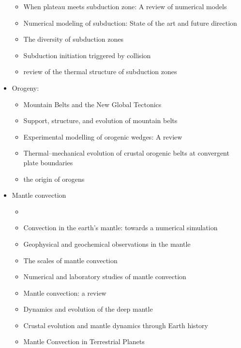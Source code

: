 \begin{itemize}
\begin{itemize}
   \item [\twothousandtwentyone] When plateau meets subduction zone: A review of numerical models \cite{lidl21}
   \item [\twothousandtwentytwo] Numerical modeling of subduction: State of the art and future direction \cite{gery22}
   \item [\twothousandtwentytwo] The diversity of subduction zones \cite{chmm22}
   \item [\twothousandtwentytwo] Subduction initiation triggered by collision \cite{yang22} 
   \item [\twothousandtwentythree] review of the thermal structure of subduction zones \cite{vawi23,wiva23}

   \end{itemize}

\item Orogeny:
   \begin{itemize}
   \item [\nineteenseventy] Mountain Belts and the New Global Tectonics  \cite{debi70}
   \item [\nineteeneightyeight] Support, structure, and evolution of mountain belts \cite{moly88}
   \item [\twothousandtwelve] Experimental modelling of orogenic wedges: A review \cite{grmd12} 
   \item [\twothousandtwelve] Thermal–mechanical evolution of crustal orogenic belts at convergent plate boundaries \cite{vand12}
   \item [\twothousandthirteen] the origin of orogens \cite{jabe13}
   \end{itemize}

\item Mantle convection 

   \begin{itemize}
   \item {}
   \item [\nineteenseventyfour] Convection in the earth’s mantle: towards a numerical simulation \cite{mcrw74}
   \item [\nineteenninetytwo] Geophysical and geochemical observations in the mantle \cite{dari92}
   \item [\nineteenninetyeight] The scales of mantle convection \cite{ande98}
   \item [\twothousandfive] Numerical and laboratory studies of mantle convection \cite{taxn05}
   \item [\twothousandeight] Mantle convection: a review \cite{ogaw08}
   \item [\twothousandtwelve] Dynamics and evolution of the deep mantle  \cite{tack12}
   \item [\twothousandeighteen] Crustal evolution and mantle dynamics through Earth history \cite{kore18}
   \item [\twothousandtwenty] Mantle Convection in Terrestrial Planets \cite{mube20}
   \end{itemize}


\end{itemize}
